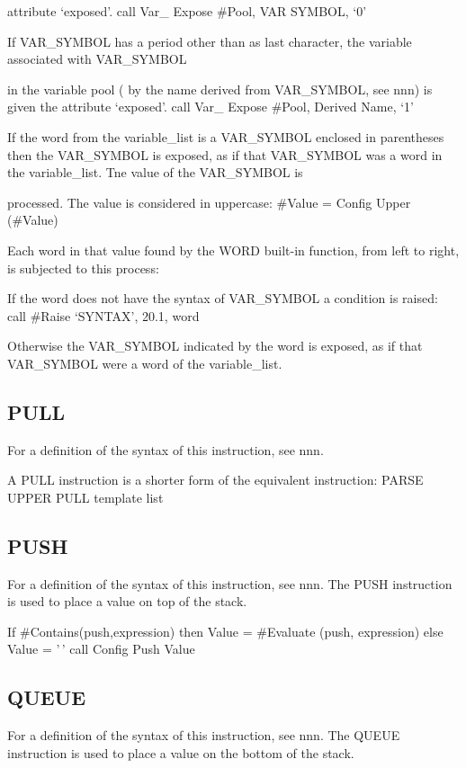 attribute `exposed'. call Var\_ Expose \#Pool, VAR SYMBOL, `0'

If VAR\_SYMBOL has a period other than as last character, the variable
associated with VAR\_SYMBOL

in the variable pool ( by the name derived from VAR\_SYMBOL, see nnn) is
given the attribute `exposed'. call Var\_ Expose \#Pool, Derived Name,
`1'

If the word from the variable\_list is a VAR\_SYMBOL enclosed in
parentheses then the VAR\_SYMBOL is exposed, as if that VAR\_SYMBOL was
a word in the variable\_list. Tne value of the VAR\_SYMBOL is

processed. The value is considered in uppercase: \#Value = Config Upper
(\#Value)

Each word in that value found by the WORD built-in function, from left
to right, is subjected to this process:

If the word does not have the syntax of VAR\_SYMBOL a condition is
raised: call \#Raise `SYNTAX', 20.1, word

Otherwise the VAR\_SYMBOL indicated by the word is exposed, as if that
VAR\_SYMBOL were a word of the variable\_list.

\hypertarget{pull}{%
\subsection{PULL}\label{pull}}

For a definition of the syntax of this instruction, see nnn.

A PULL instruction is a shorter form of the equivalent instruction:
PARSE UPPER PULL template list

\hypertarget{push}{%
\subsection{PUSH}\label{push}}

For a definition of the syntax of this instruction, see nnn. The PUSH
instruction is used to place a value on top of the stack.

If \#Contains(push,expression) then Value = \#Evaluate (push,
expression) else Value = '\,' call Config Push Value

\hypertarget{queue}{%
\subsection{QUEUE}\label{queue}}

For a definition of the syntax of this instruction, see nnn. The QUEUE
instruction is used to place a value on the bottom of the stack.

